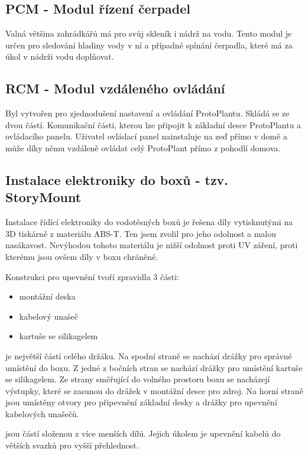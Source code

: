 \subsection{PCM - Modul řízení čerpadel}
\label{subsec:PCM}
Valná většina zahrádkářů má pro svůj skleník i nádrž na vodu.
Tento modul je určen pro sledování hladiny vody v ní a případné spínání čerpadla, které má za úkol v nádrži vodu doplňovat.

\subsection{RCM - Modul vzdáleného ovládání}
\label{subsec:RCM}
Byl vytvořen pro zjednodušení nastavení a ovládání ProtoPlantu.
Skládá se ze dvou částí. 
Komunikační části, kterou lze připojit k základní desce ProtoPlantu a ovládacího panelu. 
Uživatel ovládací panel nainstaluje na zeď přímo v domě a může díky němu vzdáleně ovládat celý ProtoPlant přímo z pohodlí domova. 

\subsection{Instalace elektroniky do boxů - tzv. StoryMount}
Instalace řídící elektroniky do vodotěsných boxů je řešena díly vytisknutými na 3D tiskárně z materiálu ABS-T.
Ten jsem zvolil pro jeho odolnost a malou nasákavost.
Nevýhodou tohoto materiálu je nižší odolnost proti UV záření, proti kterému jsou ovšem díly v boxu chráněné.

Konstrukci pro upevnění tvoří zpravidla 3 části:
\begin{itemize}
    \item montážní deska
    \item kabelový unašeč
    \item kartuše se silikagelem
\end{itemize}

\noindent{} je největší částí celého držáku. 
Na spodní straně se nachází drážky pro správné umístění do boxu.
Z jedné z bočních stran se nachází drážky pro umístění kartuše se silikagelem.
Ze strany směřující do volného prostoru boxu se nacházejí výstupky, které se zasunou do drážek v montážní desce pro zdroj.
Na horní straně jsou umístěny otvory pro připevnění základní desky a drážky pro upevnění kabelových unašečů.

\noindent{} jsou částí složenou z více menších dílů.
Jejich úkolem je upevnění kabelů do větších svazků pro vyšší přehlednost.

